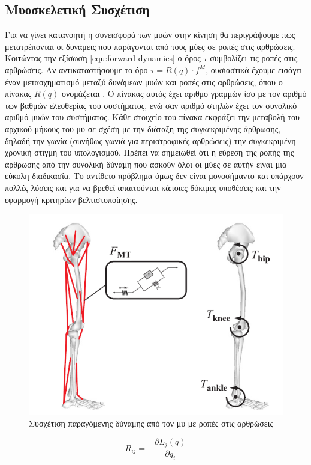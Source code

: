 \subsection{Μυοσκελετική Συσχέτιση}
\label{subsec:muscle}

Για να γίνει κατανοητή η συνεισφορά των μυών στην κίνηση θα περιγράψουμε πως μετατρέπονται οι δυνάμεις που παράγονται από τους μύες σε ροπές στις αρθρώσεις. Κοιτώντας την εξίσωση \ref{equ:forward-dynamics} ο όρος $\tau$ συμβολίζει τις ροπές στις αρθρώσεις. Αν αντικαταστήσουμε το όρο $\tau = R(q) \cdot f^{M}$, ουσιαστικά έχουμε εισάγει έναν μετασχηματισμό μεταξύ δυνάμεων μυών και ροπές στις αρθρώσεις, όπου ο πίνακας $R(q)$ ονομάζεται . Ο πίνακας αυτός έχει αριθμό γραμμών ίσο με τον αριθμό των βαθμών ελευθερίας του συστήματος, ενώ σαν αριθμό στηλών έχει τον συνολικό αριθμό μυών του συστήματος. Κάθε στοιχείο του πίνακα εκφράζει την μεταβολή του αρχικού μήκους του μυ σε σχέση με την διάταξη της συγκεκριμένης άρθρωσης, δηλαδή την γωνία (συνήθως γωνιά για περιστροφικές αρθρώσεις) την συγκεκριμένη χρονική στιγμή του υπολογισμού. Πρέπει να σημειωθεί ότι η εύρεση της ροπής της άρθρωσης από την συνολική δύναμη που ασκούν όλοι οι μύες σε αυτήν είναι μια εύκολη διαδικασία. Το αντίθετο πρόβλημα όμως δεν είναι μονοσήμαντο και υπάρχουν πολλές λύσεις και για να βρεθεί απαιτούνται κάποιες δόκιμες υποθέσεις και την εφαρμογή κριτηρίων βελτιστοποίησης.

\begin{figure}[H]
    \centering
    \includegraphics[width=.6\textwidth, height=.30\textheight, keepaspectratio]{fig/muscle-skeleton-torque.png}
    \caption{Συσχέτιση παραγόμενης δύναμης από τον μυ με ροπές στις αρθρώσεις \cite{erdemir07}}
    \label{fig:force-torques}
\end{figure}

\begin{equation}
    R_{ij} = - \frac{\partial L_{j}(q)}{\partial q_{i}}
    \label{equ:muscle-moment-arm}
\end{equation}

